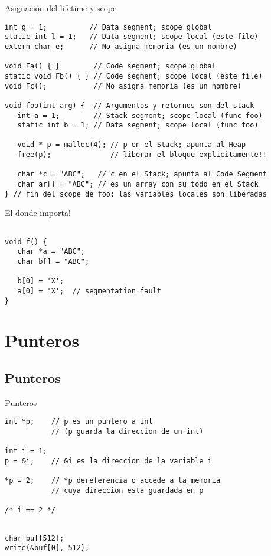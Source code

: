\begin{frame}[fragile]{Asignaci\'on del lifetime y scope}
         \begin{lstlisting}[style=normal]
int g = 1;          // Data segment; scope global
static int l = 1;   // Data segment; scope local (este file)
extern char e;      // No asigna memoria (es un nombre)

void Fa() { }        // Code segment; scope global
static void Fb() { } // Code segment; scope local (este file)
void Fc();           // No asigna memoria (es un nombre)

void foo(int arg) {  // Argumentos y retornos son del stack
   int a = 1;        // Stack segment; scope local (func foo)
   static int b = 1; // Data segment; scope local (func foo)
   
   void * p = malloc(4); // p en el Stack; apunta al Heap
   free(p);              // liberar el bloque explicitamente!!
   
   char *c = "ABC";   // c en el Stack; apunta al Code Segment
   char ar[] = "ABC"; // es un array con su todo en el Stack
} // fin del scope de foo: las variables locales son liberadas
         \end{lstlisting}
\end{frame}
\begin{frame}[fragile]{El donde importa!}
         \begin{lstlisting}[style=normal]

void f() {
   char *a = "ABC";
   char b[] = "ABC";

   b[0] = 'X';
   a[0] = 'X';  // segmentation fault
}
         \end{lstlisting}
\end{frame}

\section{Punteros}
\subsection{Punteros}
\begin{frame}[fragile]{Punteros}
         \begin{lstlisting}[style=normal]
int *p;    // p es un puntero a int
           // (p guarda la direccion de un int)

int i = 1;
p = &i;    // &i es la direccion de la variable i

*p = 2;    // *p dereferencia o accede a la memoria
           // cuya direccion esta guardada en p

/* i == 2 */

         \end{lstlisting}
         \begin{lstlisting}[style=normal]

char buf[512];
write(&buf[0], 512);

         \end{lstlisting}
\end{frame}

